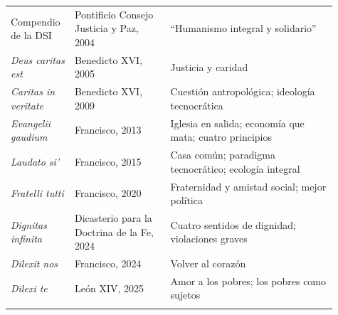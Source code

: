 \documentclass[10pt,a4paper]{article}
\begin{document}
{\begin{longtable}{>{\raggedright\arraybackslash}p{0.163\linewidth}>{\raggedright\arraybackslash}p{0.275\linewidth}>{\raggedright\arraybackslash}p{0.472\linewidth}}
Compendio de la DSI & Pontificio Consejo Justicia y Paz, 2004 & ``Humanismo integral y solidario'' \\ \addlinespace[2pt]
\textit{Deus caritas est} & Benedicto XVI, 2005 & Justicia y caridad \\ \addlinespace[2pt]
\textit{Caritas in veritate} & Benedicto XVI, 2009 & Cuestión antropológica; ideología tecnocrática \\ \addlinespace[2pt]
\textit{Evangelii gaudium} & Francisco, 2013 & Iglesia en salida; economía que mata; cuatro principios \\ \addlinespace[2pt]
\textit{Laudato si'} & Francisco, 2015 & Casa común; paradigma tecnocrático; ecología integral \\ \addlinespace[2pt]
\textit{Fratelli tutti} & Francisco, 2020 & Fraternidad y amistad social; mejor política \\ \addlinespace[2pt]
\textit{Dignitas infinita} & Dicasterio para la Doctrina de la Fe, 2024 & Cuatro sentidos de dignidad; violaciones graves \\ \addlinespace[2pt]
\textit{Dilexit nos} & Francisco, 2024 & Volver al corazón \\ \addlinespace[2pt]
\textit{Dilexi te} & León XIV, 2025 & Amor a los pobres; los pobres como sujetos \\ \addlinespace[2pt]
\bottomrule\end{longtable}}
\end{document}
